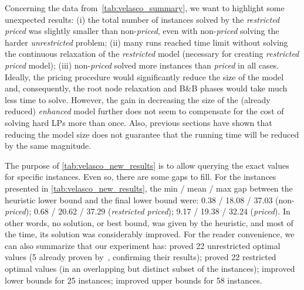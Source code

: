 \documentclass[smallextended]{svjour3}       %
\begin{document}
Concerning the data from~\autoref{tab:velasco_summary}, we want to highlight some unexpected results:
(i) the total number of instances solved by the \emph{restricted priced} was slightly smaller than non-\emph{priced}, even with non-\emph{priced} solving the harder \emph{unrestricted} problem;
(ii) many runs reached time limit without solving the continuous relaxation of the \emph{restricted} model (necessary for creating \emph{restricted priced} model);
(iii) non-\emph{priced} solved more instances than \emph{priced} in all cases.
Ideally, the pricing procedure would significantly reduce the size of the model and, consequently, the root node relaxation and B\&B phases would take much less time to solve.
However, the gain in decreasing the size of the (already reduced) \emph{enhanced} model further does not seem to compensate for the cost of solving hard LPs more than once.
Also, previous sections have shown that reducing the model size does not guarantee that the running time will be reduced by the same magnitude.

The purpose of \autoref{tab:velasco_new_results} is to allow querying the exact values for specific instances.
Even so, there are some gaps to fill.
For the instances presented in \autoref{tab:velasco_new_results},
the min / mean / max gap between the heuristic lower bound and the final lower bound were: 0.38 / 18.08 / 37.03 (non-\emph{priced}); 0.68 / 20.62 / 37.29 (\emph{restricted priced}); 9.17 / 19.38 / 32.24 (\emph{priced}).
In other words, no solution, or best bound, was given by the heuristic, and most of the time, its solution was considerably improved.
For the reader convenience, we can also summarize that our experiment has:
proved 22 unrestricted optimal values (5 already proven by~\cite{velasco:2019}, confirming their results);
proved 22 restricted optimal values (in an overlapping but distinct subset of the instances);
improved lower bounds for 25 instances;
improved upper bounds for 58 instances.
\end{document}
